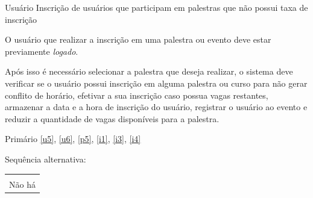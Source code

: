 {Usuário}
{Inscrição de usuários que participam em palestras que não possui taxa de inscrição}
{O usuário que realizar a inscrição em uma palestra ou evento deve estar previamente \textit{logado}.

Após isso é necessário selecionar a palestra que deseja realizar, o sistema deve verificar se o usuário possui inscrição em alguma palestra ou curso para não gerar conflito de horário, efetivar a sua inscrição caso possua vagas restantes, armazenar a data e a hora de inscrição do usuário, registrar o usuário ao evento e reduzir a quantidade de vagas disponíveis para a palestra.}
{Primário}
{\ref{u5}, \ref{u6}, \ref{p5}, \ref{i1}, \ref{i3}, \ref{i4}}


Sequência alternativa:
\begin{table}[H]
    \centering
    \begin{tabular}{|p{15cm}|}
        \hline\\
            Não há\\
        \hline
    \end{tabular}
\end{table}


